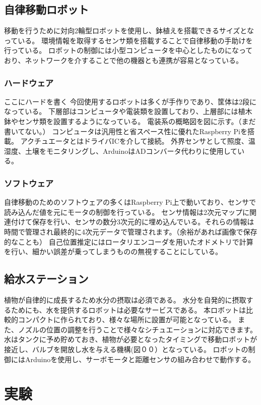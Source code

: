 \documentclass[10pt]{jsarticle}
\begin{document}
\subsection{自律移動ロボット}
移動を行うために対向2輪型ロボットを使用し、鉢植えを搭載できるサイズとなっている。
環境情報を取得するセンサ類を搭載することで自律移動の手助けを行っている。
ロボットの制御には小型コンピュータを中心としたものになっており、ネットワークを介することで他の機器とも連携が容易となっている。
\subsubsection{ハードウェア}
ここにハードを書く
今回使用するロボットは多くが手作りであり、筐体は2段になっている。
下層部はコンピュータや電装類を設置しており、上層部には植木鉢やセンサ類を設置するようになっている。
電装系の概略図を図に示す。（まだ書いてない。）
コンピュータは汎用性と省スペース性に優れたRaspberry Piを搭載。
アクチュエータとはドライバICを介して接続。
外界センサとして照度、温湿度、土壌をモニタリングし、ArduinoはADコンバータ代わりに使用している。
\subsubsection{ソフトウェア}
自律移動のためのソフトウェアの多くはRaspberry Pi上で動いており、センサで読み込んだ値を元にモータの制御を行っている。
センサ情報は2次元マップに関連付けて保存を行い、センサの数分3次元的に埋め込んでいる。それらの情報は時間で管理され最終的に4次元データで管理されます。（余裕があれば画像で保存的なことも）
自己位置推定にはロータリエンコーダを用いたオドメトリで計算を行い、細かい誤差が乗ってしまうものの無視することにしている。

\subsection{給水ステーション}
植物が自律的に成長するため水分の摂取は必須である。
水分を自発的に摂取するためにも、水を提供するロボットは必要なサービスである。
本ロボットは比較的コンパクトに作られており、様々な場所に設置が可能となっている。
また、ノズルの位置の調整を行うことで様々なシチュエーションに対応できます。
水はタンクに予め貯めておき、植物が必要となったタイミングで移動ロボットが接近し、バルブを開放し水を与える機構(図００）となっている。
ロボットの制御にはArduinoを使用し、サーボモータと距離センサの組み合わせで動作する。

\section{実験}
\end{document}
